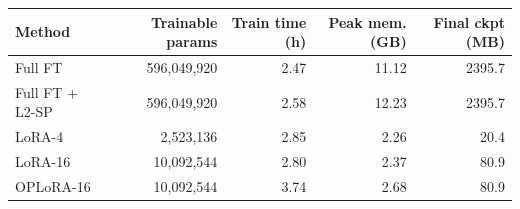 \begin{tabular}{lrrrr}
\toprule
Method & Trainable params & Train time (h) & Peak mem. (GB) & Final ckpt (MB) \\
\midrule
Full FT & 596,049,920 & 2.47 & 11.12 & 2395.7 \\
Full FT + L2-SP & 596,049,920 & 2.58 & 12.23 & 2395.7 \\
LoRA-4 & 2,523,136 & 2.85 & 2.26 & 20.4 \\
LoRA-16 & 10,092,544 & 2.80 & 2.37 & 80.9 \\
OPLoRA-16 & 10,092,544 & 3.74 & 2.68 & 80.9 \\
\bottomrule
\end{tabular}